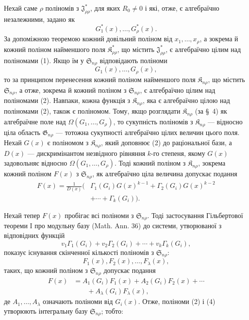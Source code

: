 \documentclass[11pt]{article}
\providecommand{\Kfield}{\mathfrak{K}}
\providecommand{\Ssys}{\mathfrak{S}}
\providecommand{\Jdom}{\mathfrak{J}}
\providecommand{\Gdom}{\mathfrak{G}}
\begin{document}
Нехай саме $\rho$ поліномів з $\Jdom^*_{\rho\rho}$, для яких $R_0\ne0$ і які, отже, є алгебраїчно незалежними, задано як
\begin{equation}
  G_1^*(x),\ldots,G_\rho^*(x).
\tag{1}
\end{equation}
За допоміжною теоремою кожний довільний поліном від $x_1,\ldots,x_\rho$, а зокрема й кожний поліном найменшого поля $\Kfield^*_{\rho\rho}$, що містить $\Jdom^*_{\rho\rho}$, є алгебраїчно цілим над поліномами (1). Якщо їм у $\Ssys_{n\rho}$ відповідають поліноми
\begin{equation}
  G_1(x),\ldots,G_\rho(x),
\tag{2}
\end{equation}
то за принципом перенесення кожний поліном найменшого поля $\Kfield_{n\rho}$, що містить $\Ssys_{n\rho}$, а отже, зокрема й кожний поліном з $\Ssys_{n\rho}$, є алгебраїчно цілим над поліномами (2). Навпаки, кожна функція з $\Kfield_{n\rho}$, яка є алгебраїчно цілою над поліномами (2), також є поліномом. Тому, якщо розглядати $\Kfield_{n\rho}$ (за \S\ 4) як алгебраїчне поле над $\Omega(G_1,\ldots,G_\rho)$, то сукупність поліномів з $\Kfield_{n\rho}$ --- відносно ціла область $\Gdom_{n\rho}$ --- тотожна сукупності алгебраїчно цілих величин цього поля. Нехай $G(x)$ є поліномом з $\Kfield_{n\rho}$, який доповнює (2) до раціональної бази, а $D(x)$ --- дискримінантом незвідного рівняння $k$-го степеня, якому $G(x)$ задовольняє відносно $\Omega(G_1,\ldots,G_\rho)$. Тоді кожний поліном з $\Kfield_{n\rho}$, зокрема кожний поліном $F(x)$ з $\Ssys_{n\rho}$, як алгебраїчно ціла величина допускає подання
\begin{equation}
\begin{split}
  F(x)=\frac{1}{D(x)}\big(&\Gamma_1(G_i)G(x)^{k-1}
    +\Gamma_2(G_i)G(x)^{k-2}\\
    &+\cdots+\Gamma_k(G_i)\big).
\end{split}
\tag{3}
\end{equation}

Нехай тепер $F(x)$ пробігає всі поліноми з $\Ssys_{n\rho}$. Тоді застосування Гільбертової теореми I про модульну базу (Math. Ann. 36) до системи, утворюваної з відповідних функцій
\[
  v_1\Gamma_1(G_i)+v_2\Gamma_2(G_i)+\cdots+v_k\Gamma_k(G_i),
\]
показує існування скінченної кількості поліномів з $\Ssys_{n\rho}$:
\begin{equation}
  F_1(x),F_2(x),\ldots,F_\lambda(x),
\tag{4}
\end{equation}
таких, що кожний поліном з $\Ssys_{n\rho}$ допускає подання
\begin{equation}
\begin{aligned}
  F(x)&=A_1(G_i)F_1(x)+A_2(G_i)F_2(x)+\cdots\\
      &\qquad +A_\lambda(G_i)F_\lambda(x),
\end{aligned}
\tag{5}
\end{equation}
де $A_1,\ldots,A_\lambda$ означають поліноми від $G_i(x)$. Отже, поліноми (2) і (4) утворюють інтегральну базу $\Ssys_{n\rho}$; тобто:
\end{document}
